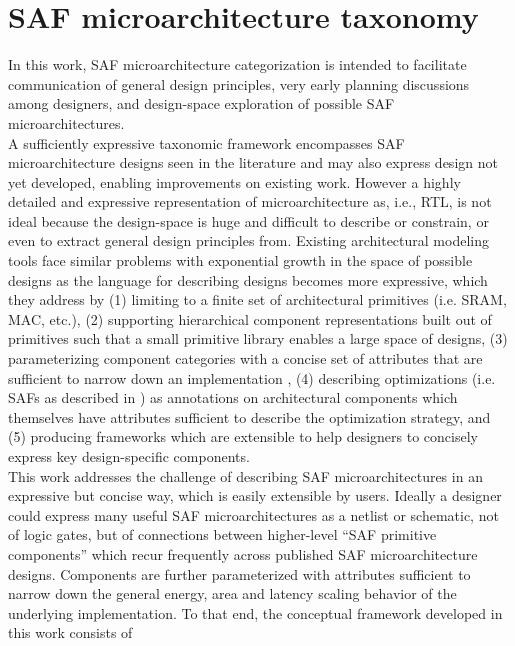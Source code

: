 \chapter{SAF microarchitecture taxonomy}
\label{chapter:primitive_taxo_model}

In this work, SAF microarchitecture categorization is intended to facilitate communication of general design principles, very early planning discussions among designers, and design-space exploration of possible SAF microarchitectures.  \\
%
A sufficiently expressive taxonomic framework encompasses SAF microarchitecture designs seen in the literature and may also express design not yet developed, enabling improvements on existing work. However a highly detailed and expressive representation of microarchitecture as, i.e., RTL, is not ideal because the design-space is huge and difficult to describe or constrain, or even to extract general design principles from. Existing architectural modeling tools face similar problems with exponential growth in the space of possible designs as the language for describing designs becomes more expressive, which they address by (1) limiting to a finite set of architectural primitives (i.e. SRAM, MAC, etc.)\cite{timeloop}, (2) supporting hierarchical component representations built out of primitives \cite{accelergy} such that a small primitive library enables a large space of designs, (3) parameterizing component categories with a concise set of attributes that are sufficient to narrow down an implementation \cite{accelergy}, (4) describing optimizations (i.e. SAFs as described in \cite{sparseloop}) as annotations on architectural components which themselves have attributes sufficient to describe the optimization strategy, and (5) producing frameworks which are extensible to help designers to concisely express key design-specific components.  \\
%
This work addresses the challenge of describing SAF microarchitectures in an expressive but concise way, which is easily extensible by users. Ideally a designer could express many useful SAF microarchitectures as a netlist or schematic, not of logic gates, but of connections between higher-level ``SAF primitive components'' which recur frequently across published SAF microarchitecture designs. Components are further parameterized with attributes sufficient to narrow down the general energy, area and latency scaling behavior of the underlying implementation. To that end, the conceptual framework developed in this work consists of
